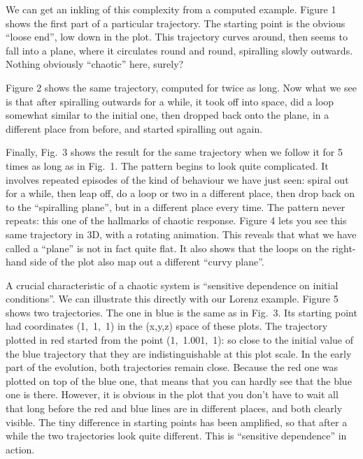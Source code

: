   We can get an inkling of this complexity from a computed example. Figure 1 
  shows the first part of a particular trajectory. The starting point is the 
  obvious ``loose end'', low down in the plot. This trajectory curves around, 
  then seems to fall into a plane, where it circulates round and round, 
  spiralling slowly outwards. Nothing obviously “chaotic” here, surely? 

  Figure 2 shows the same trajectory, computed for twice as long. Now what we 
  see is that after spiralling outwards for a while, it took off into space, 
  did a loop somewhat similar to the initial one, then dropped back onto the 
  plane, in a different place from before, and started spiralling out again. 

  Finally, Fig.\ 3 shows the result for the same trajectory when we follow it 
  for 5 times as long as in Fig.\ 1. The pattern begins to look quite 
  complicated. It involves repeated episodes of the kind of behaviour we have 
  just seen: spiral out for a while, then leap off, do a loop or two in a 
  different place, then drop back on to the “spiralling plane”, but in a 
  different place every time. The pattern never repeats: this one of the 
  hallmarks of chaotic response. Figure 4 lets you see this same trajectory in 
  3D, with a rotating animation. This reveals that what we have called a 
  “plane” is not in fact quite flat. It also shows that the loops on the 
  right-hand side of the plot also map out a different “curvy plane”. 

  A crucial characteristic of a chaotic system is “sensitive dependence on 
  initial conditions”. We can illustrate this directly with our Lorenz example. 
  Figure 5 shows two trajectories. The one in blue is the same as in Fig.\ 3. 
  Its starting point had coordinates (1,~1,~1) in the (x,y,z) space of these 
  plots. The trajectory plotted in red started from the point (1,~1.001,~1): so 
  close to the initial value of the blue trajectory that they are 
  indistinguishable at this plot scale. In the early part of the evolution, 
  both trajectories remain close. Because the red one was plotted on top of the 
  blue one, that means that you can hardly see that the blue one is there. 
  However, it is obvious in the plot that you don't have to wait all that long 
  before the red and blue lines are in different places, and both clearly 
  visible. The tiny difference in starting points has been amplified, so that 
  after a while the two trajectories look quite different. This is ``sensitive 
  dependence'' in action. 

